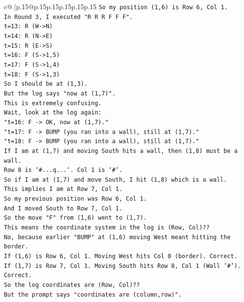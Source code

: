 \documentclass{article}
\begin{document}
{\begin{supertabular}{c@{$\;$}|p{.15\linewidth}@{}p{.15\linewidth}p{.15\linewidth}p{.15\linewidth}p{.15\linewidth}p{.15\linewidth}}
{{{\texttt{So my position (1,6) is Row 6, Col 1.} \\
\texttt{In Round 3, I executed "R R R F F F".} \\
\texttt{t=13: R (W{-}>N)} \\
\texttt{t=14: R (N{-}>E)} \\
\texttt{t=15: R (E{-}>S)} \\
\texttt{t=16: F (S{-}>1,5)} \\
\texttt{t=17: F (S{-}>1,4)} \\
\texttt{t=18: F (S{-}>1,3)} \\
\texttt{So I should be at (1,3).} \\
\texttt{But the log says "now at (1,7)".} \\
\texttt{This is extremely confusing.} \\
\texttt{Wait, look at the log again:} \\
\texttt{"t=16: F {-}> OK, now at (1,7)."} \\
\texttt{"t=17: F {-}> BUMP (you ran into a wall), still at (1,7)."} \\
\texttt{"t=18: F {-}> BUMP (you ran into a wall), still at (1,7)."} \\
\texttt{If I am at (1,7) and moving South hits a wall, then (1,8) must be a wall.} \\
\texttt{Row 8 is `\#...q...`. Col 1 is `\#`.} \\
\texttt{So if I am at (1,7) and move South, I hit (1,8) which is a wall.} \\
\texttt{This implies I am at Row 7, Col 1.} \\
\texttt{So my previous position was Row 6, Col 1.} \\
\texttt{And I moved South to Row 7, Col 1.} \\
\texttt{So the move "F" from (1,6) went to (1,7).} \\
\texttt{This means the coordinate system in the log is (Row, Col)??} \\
\texttt{No, because earlier "BUMP" at (1,6) moving West meant hitting the border.} \\
\texttt{If (1,6) is Row 6, Col 1. Moving West hits Col 0 (border). Correct.} \\
\texttt{If (1,7) is Row 7, Col 1. Moving South hits Row 8, Col 1 (Wall '\#'). Correct.} \\
\texttt{So the log coordinates are (Row, Col)??} \\
\texttt{But the prompt says "coordinates are (column,row)".} \\
}}}
\end{supertabular}}
\end{document}
